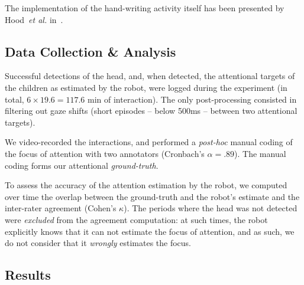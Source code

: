 \documentclass{sig-alternate}
\newcommand{\etal}{\textit{et al.}\xspace}
\begin{document}
The implementation of the hand-writing activity itself has been presented by
Hood~\etal in~\cite{Hood:2015}.

\subsection{Data Collection \& Analysis}

Successful detections of the head, and, when detected, the attentional targets
of the children as estimated by the robot, were logged during the experiment (in
total, $6\times19.6=117.6$ min of interaction). The only post-processing
consisted in filtering out gaze shifts (short episodes -- below 500ms -- between
two attentional targets).

We video-recorded the interactions, and performed a {\it post-hoc} manual coding
of the focus of attention with two annotators (Cronbach's
$\alpha=.89$).
The manual coding forms our attentional \emph{ground-truth}.

To assess the accuracy of the attention estimation by the robot, we computed
over time the overlap between the ground-truth and the robot's estimate and the
inter-rater agreement (Cohen's $\kappa$). The periods where the head was not
detected were \emph{excluded} from the agreement computation: at such times, the
robot explicitly knows that it can not estimate the focus of attention, and as
such, we do not consider that it \emph{wrongly} estimates the focus.



\subsection{Results}
\end{document}
